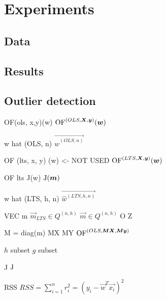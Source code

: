 \chapter{Experiments}
\section{Data}
\section{Results}
\section{Outlier detection}

OF(ols, x,y)(w)
$ \operatorname{OF}^{(OLS,\boldsymbol{X}, \boldsymbol{y})}(\boldsymbol{w}) $

w hat (OLS, n)
$ \vec{\hat{w}^{(OLS, n)}}$


OF (lts, x, y) (w)  <- NOT USED
$\operatorname{OF}^{(LTS,\boldsymbol{X}, \boldsymbol{y})}(\boldsymbol{w})$

OF lts J(w)
$\operatorname{J}(\boldsymbol{m})$


w hat (LTS, h, n)
$ \vec{\hat{w}^{(LTS, h, n)}}$

VEC m
$\vec{m}_{LTS} \in Q^{(n,h)}$
$\vec{m} \in Q^{(n,h)}$
O Z

M = diag(m)
MX MY
$\operatorname{OF}^{(OLS,\boldsymbol{M}\boldsymbol{X},  \boldsymbol{M}\boldsymbol{y} )}$

$h$ subset
$g$ subset

J
$\operatorname{J}$

RSS
$ RSS = \sum\limits_{i=1}^n r_i^2 = (y_i - \vec{w}^T\vec{x_i})^2 $